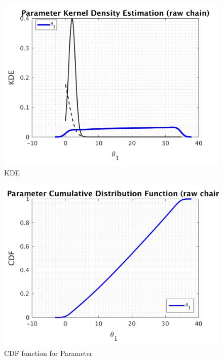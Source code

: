 \begin{figure}[h!]
  
  \centering
   \includegraphics[scale=0.75]{output_100/simple_ip_kde_raw}
   \caption{ KDE }
\end{figure}
%
\begin{figure}[h!]
  
  \centering
   \includegraphics[scale=0.75]{output_100/simple_ip_cdf_raw}
   \caption{CDF function for Parameter }
\end{figure}

\clearpage

